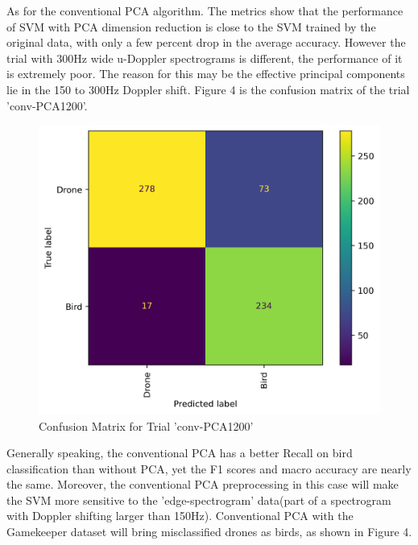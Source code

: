 \documentclass{cta-author}
\begin{document}
As for the conventional PCA algorithm. The metrics show that the performance of SVM with PCA dimension reduction is close to the SVM trained by the original data, with only a few percent drop in the average accuracy.
However the trial with 300Hz wide u-Doppler spectrograms is different, the performance of it is extremely poor. The reason for this may be the effective principal components lie in the 150 to 300Hz Doppler shift. 
Figure 4 is the confusion matrix of the trial 'conv-PCA1200'.
\begin{figure}[h]
\centering\includegraphics[scale = 0.5]{Image/ConvPCA_with1201binCFM60.png}
\caption{Confusion Matrix for Trial 'conv-PCA1200'}
\end{figure}
Generally speaking, the conventional PCA has a better Recall on bird classification than without PCA, yet the F1 scores and macro accuracy are nearly the same. Moreover, the conventional PCA preprocessing in this case will make the SVM more sensitive to the 'edge-spectrogram' data(part of a spectrogram with Doppler shifting larger than 150Hz). Conventional PCA with the Gamekeeper dataset will bring misclassified drones as birds, as shown in Figure 4.
\end{document}
